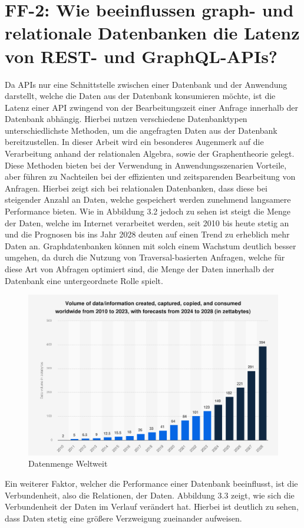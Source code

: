 \section{FF-2: Wie beeinflussen graph- und relationale Datenbanken die Latenz von REST- und GraphQL-APIs?} %
\label{sec:ff2}
Da APIs nur eine Schnittstelle zwischen einer Datenbank und der Anwendung darstellt, welche die Daten aus der Datenbank konsumieren möchte, ist die Latenz einer API zwingend von der Bearbeitungszeit einer Anfrage innerhalb der Datenbank abhängig. Hierbei nutzen verschiedene Datenbanktypen unterschiedlichste Methoden, um die angefragten Daten aus der Datenbank bereitzustellen. In dieser Arbeit wird ein besonderes Augenmerk auf die Verarbeitung anhand der relationalen Algebra, sowie der Graphentheorie gelegt. Diese Methoden bieten bei der Verwendung in Anwendungsszenarien Vorteile, aber führen zu Nachteilen bei der effizienten und zeitsparenden Bearbeitung von Anfragen. Hierbei zeigt sich bei relationalen Datenbanken, dass diese bei steigender Anzahl an Daten, welche gespeichert werden zunehmend langsamere Performance bieten.
Wie in Abbildung 3.2 jedoch zu sehen ist steigt die Menge der Daten, welche im Internet verarbeitet werden, seit 2010 bis heute stetig an und die Prognosen bis ins Jahr 2028 deuten auf einen Trend zu erheblich mehr Daten an. Graphdatenbanken können mit solch einem Wachstum deutlich besser umgehen, da durch die Nutzung von Traversal-basierten Anfragen, welche für diese  Art von Abfragen optimiert sind, die Menge der Daten innerhalb der Datenbank eine untergeordnete Rolle spielt. \citep{9677042} \citep{performancenosql}
\begin{figure}[H]
	\centering
	\includegraphics[scale=.4]{Illustrations/growthofdata.png}
	\caption{Datenmenge Weltweit \citep{statista}}
\end{figure}
\noindent
Ein weiterer Faktor, welcher die Performance einer Datenbank beeinflusst, ist die Verbundenheit, also die Relationen, der Daten. Abbildung 3.3 zeigt, wie sich die Verbundenheit der Daten im Verlauf verändert hat. Hierbei ist deutlich zu sehen, dass Daten stetig eine größere Verzweigung zueinander aufweisen. 

